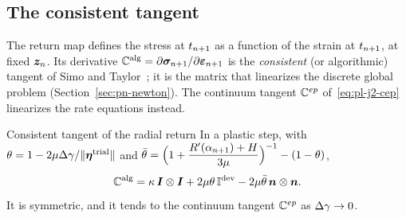 \subsection{The consistent tangent}\label{ssec:pn-calg}
%
The return map defines the stress at $t_{n+1}$ as a function of the strain at
$t_{n+1}$, at fixed $\bm{z}_n$. Its derivative
$\mathbb{C}^{\mathrm{alg}}=\partial\bm{\sigma}_{n+1}/\partial\bm{\varepsilon}_{n+1}$ is the \emph{consistent} (or
algorithmic) tangent of Simo and Taylor~\cite{SimoTaylor1985}; it is the
matrix that linearizes the discrete global problem
(Section~\ref{sec:pn-newton}). The continuum tangent $\mathbb{C}^{ep}$
of~\eqref{eq:pl-j2-cep} linearizes the rate equations instead.

\begin{gbox}{Consistent tangent of the radial return}\label{prop:pn-calg}
In a plastic step, with $\theta=1-2\mu\Delta\gamma/\lVert \bm{\eta}^{\mathrm{trial}}\rVert$ and
$\displaystyle \bar\theta=\Bigl(1+\frac{R'(\alpha_{n+1})+H}{3\mu}\Bigr)^{-1}-(1-\theta)$,
\begin{equation}\label{eq:pn-calg}
  \mathbb{C}^{\mathrm{alg}}=\kappa\,\bm{I}\otimes\bm{I}+2\mu\theta\,\mathbb{I}^{\mathrm{dev}}-2\mu\bar\theta\,\bm{n}\otimes\bm{n} .
\end{equation}
It is symmetric, and it tends to the continuum tangent $\mathbb{C}^{ep}$ as $\Delta\gamma\to0$.
\end{gbox}
